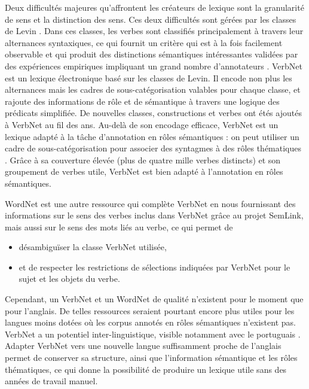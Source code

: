 Deux difficultés majeures qu'affrontent les créateurs de lexique sont la
granularité de sens et la distinction des sens. Ces deux difficultés sont
gérées par les classes de Levin \citep{levin1993english}. Dans ces classes, les
verbes sont classifiés principalement à travers leur alternances syntaxiques,
ce qui fournit un critère qui est à la fois facilement observable et qui
produit des distinctions sémantiques intéressantes validées par des expériences
empiriques impliquant un grand nombre d'annotateurs
\citep{hartshorne2014verbcorner}. VerbNet \citep{kipperschuler2005verbnet} est
un lexique électronique basé sur les classes de Levin. Il encode non plus les
alternances mais les cadres de sous-catégorisation valables pour chaque classe,
et rajoute des informations de rôle et de sémantique à travers une logique des
prédicats simplifiée. De nouvelles classes, constructions et verbes ont étés
ajoutés à VerbNet au fil des ans. Au-delà de son encodage efficace, VerbNet est
un lexique adapté à la tâche d'annotation en rôles sémantiques : on peut
utiliser un cadre de sous-catégorisation pour associer des syntagmes à des
rôles thématiques \citep{swier2005exploiting,pradet2013revisiting}. Grâce à sa
couverture élevée (plus de quatre mille verbes distincts) et son groupement de
verbes utile, VerbNet est bien adapté à l'annotation en rôles sémantiques.


WordNet est une autre ressource qui complète VerbNet en nous fournissant des
informations sur le sens des verbes inclus dans VerbNet grâce au projet
SemLink, mais aussi sur le sens des mots liés au verbe, ce qui permet de

\begin{itemize}

    \item désambiguïser la classe VerbNet utilisée,

    \item et de respecter les restrictions de sélections indiquées par VerbNet pour
        le sujet et les objets du verbe.

\end{itemize}


Cependant, un VerbNet et un WordNet de qualité n'existent pour le moment que
pour l'anglais. De telles ressources seraient pourtant encore plus utiles pour
les langues moins dotées où les corpus annotés en rôles sémantiques n'existent
pas. VerbNet a un potentiel inter-linguistique, visible notamment avec le
portuguais \citep[section 2.2.2]{kipperschuler2005verbnet}. Adapter VerbNet
vers une nouvelle langue suffisamment proche de l'anglais permet de conserver
sa structure, ainsi que l'information sémantique et les rôles thématiques, ce
qui donne la possibilité de produire un lexique utile sans des années de
travail manuel.


